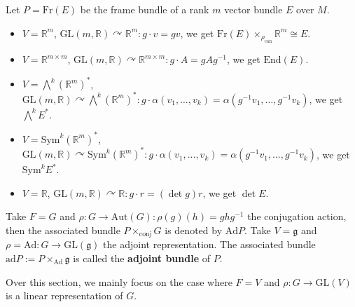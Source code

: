 \begin{example}
    Let $P=\mathrm{Fr}(E)$ be the frame bundle of a rank $m$ vector bundle $E$ over $M$. 
    \begin{itemize}[leftmargin=*]
        \item $V=\mathbb{R}^m$, $\mathrm{GL}(m, \mathbb{R})\curvearrowright\mathbb{R}^m:g\cdot v = gv$, we get $\mathrm{Fr}(E)\times_{\rho_{\mathrm{can}}}\mathbb{R}^m\cong E$. 
        \item $V=\mathbb{R}^{m\times m}$, $\mathrm{GL}(m,\mathbb{R})\curvearrowright\mathbb{R}^{m\times m}:g\cdot A = gAg^{-1}$, we get $\mathrm{End}(E)$. 
        \item $V=\bigwedge^k(\mathbb{R}^m)^*$, $\mathrm{GL}(m,\mathbb{R})\curvearrowright\bigwedge^k(\mathbb{R}^m)^*:g\cdot\alpha(v_1,\ldots,v_k) = \alpha(g^{-1}v_1,\ldots,g^{-1}v_k)$, we get $\bigwedge^k E^*$. 
        \item $V=\mathrm{Sym}^k(\mathbb{R}^m)^*$, $\mathrm{GL}(m,\mathbb{R})\curvearrowright\mathrm{Sym}^k(\mathbb{R}^m)^*:g\cdot \alpha(v_1,\ldots,v_k) = \alpha(g^{-1}v_1,\ldots,g^{-1}v_k)$, we get $\mathrm{Sym}^k E^*$.
        \item $V=\mathbb{R}$, $\mathrm{GL}(m,\mathbb{R})\curvearrowright\mathbb{R}:g\cdot r = (\det g)r$, we get $\det E$.
    \end{itemize}
\end{example}
\begin{example}
    Take $F=G$ and $\rho:G\to \mathrm{Aut}(G):\rho(g)(h) = ghg^{-1}$ the conjugation action, 
    then the associated bundle $P\times_{\mathrm{conj}} G$ is denoted by $\mathrm{Ad}P$.
    Take $V=\mathfrak{g}$ and $\rho=\mathrm{Ad}:G\to \mathrm{GL}(\mathfrak{g})$ the adjoint representation. 
    The associated bundle $\mathrm{ad}P := P\times_{\mathrm{Ad}}\mathfrak{g}$ 
    is called the \textbf{adjoint bundle} of $P$.
\end{example}
Over this section, we mainly focus on the case where $F=V$ and $\rho:G\to \mathrm{GL}(V)$ is a linear representation of $G$. 

